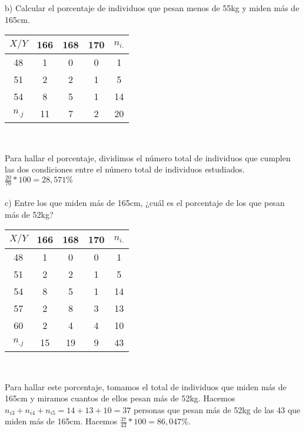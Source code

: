 \documentclass{article}
\begin{document}
    b) Calcular el porcentaje de individuos que pesan menos de 55kg y miden más de 165cm. \\
    \begin{center}
    \begin{tabular}{| c | c | c | c | c |}
        \hline
        $X / Y$ & 166 & 168 & 170 & $n_{i.}$ \\ \hline
        48 & 1 & 0 & 0 & 1 \\
        51 & 2 & 2 & 1 & 5 \\
        54 & 8 & 5 & 1 & 14 \\
        $n_{.j}$ & 11 & 7 & 2 & 20 \\
        \hline
    \end{tabular} \\ 
    \end{center}
    Para hallar el porcentaje, dividimos el número total de individuos que cumplen las dos condiciones entre el número total de individuos estudiados. \\
    $\frac{20}{70}*100 = 28,571\%$ \\ \\
    
    c) Entre los que miden más de 165cm, ¿cuál es el porcentaje de los que pesan más de 52kg? \\
    \begin{center}
    \begin{tabular}{| c | c | c | c | c |}
        \hline
        $X / Y$ & 166 & 168 & 170 & $n_{i.}$ \\ \hline
        48 & 1 & 0 & 0 & 1 \\
        51 & 2 & 2 & 1 & 5 \\
        54 & 8 & 5 & 1 & 14 \\
        57 & 2 & 8 & 3 & 13 \\
        60 & 2 & 4 & 4 & 10 \\
        $n_{.j}$ & 15 & 19 & 9 & 43 \\
        \hline
    \end{tabular} \\
    \end{center}
    Para hallar este porcentaje, tomamos el total de individuos que miden más de 165cm y miramos cuantos de ellos pesan más de 52kg. Hacemos $n_{i3}+n_{i4}+n_{i5} = 14+13+10 = 37$ personas que pesan más de 52kg de las 43 que miden más de 165cm. Hacemos $\frac{37}{43}*100 = 86,047\%$. \\ \\
    
\end{document}
